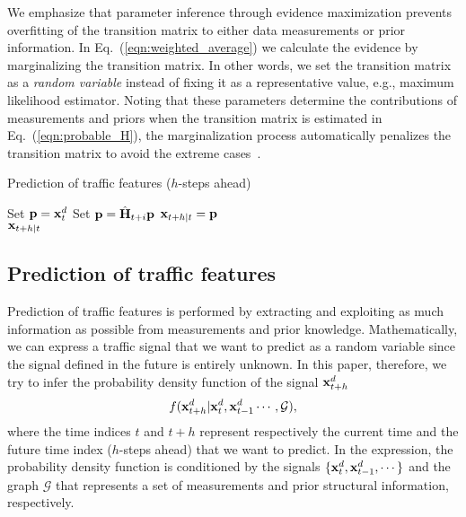 \documentclass[journal]{IEEEtran}
\begin{document}
We emphasize that parameter inference through evidence maximization prevents overfitting of the transition matrix to either data measurements or prior information.
In Eq.~(\ref{eqn:weighted_average}) we calculate the evidence by marginalizing the transition matrix. In other words, we set the transition matrix as a {\it{random variable}} instead of fixing it as a representative value, e.g., maximum likelihood estimator. Noting that these parameters determine the contributions of measurements and priors when the transition matrix is estimated in Eq.~(\ref{eqn:probable_H}), the marginalization process automatically penalizes the transition matrix to avoid the extreme cases~\cite{mackay1992bayesian}.




\begin{algorithm}[t!]
\caption{Prediction of traffic features ($h$-steps ahead)}\label{algo:prediction}
\begin{algorithmic} 
\State Set ${\bf{p}}={\bf{x}}_t^d$
\State Set ${\bf{p}}=\hat{\bf{H}}_{t+i}{\bf{p}}$ 
\EndFor
\State ${\bf{x}}_{t+h|t}={\bf{p}}$\\
\Return ${\bf{x}}_{t+h|t}$
\EndFunction
\end{algorithmic}
\end{algorithm}

\subsection{Prediction of traffic features}
Prediction of traffic features is performed by extracting and exploiting as much information as possible from measurements and prior knowledge. Mathematically, we can express a traffic signal that we want to predict as a random variable since the signal defined in the future is entirely unknown. In this paper, therefore, we try to infer the probability density function of the signal ${\bf{x}}_{t+h}^d$
\begin{equation}\label{eqn:basic_fw}
    f({\bf{x}}_{t+h}^d|{\bf{x}}_{t}^d,{\bf{x}}_{t-1}^d\cdots,\mathcal{G}),
\end{equation} 
where the time indices $t$ and $t+h$ represent respectively the current time and the future time index ($h$-steps ahead) that we want to predict. In the expression, the probability density function is conditioned by the signals $\{{\bf{x}}_t^d,{\bf{x}}_{t-1}^d,\cdots\}$ and the graph $\mathcal{G}$ that represents a set of measurements and prior structural information, respectively.
\end{document}

